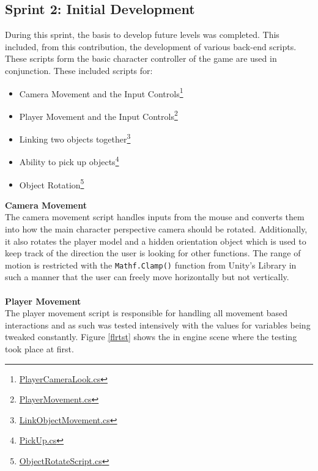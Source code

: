 \subsection{Sprint 2: Initial Development}
During this sprint, the basis to develop future levels was completed. This included, from this contribution, the development of various back-end scripts. These scripts form the basic character controller of the game are used in conjunction. These included scripts for:
\begin{itemize}
\item Camera Movement and the Input Controls\footnote{\href{https://github.com/Josh-SCG/Spherical_Shadows/blob/main/Assets/Scripts/PlayerCameraLook.cs}{PlayerCameraLook.cs}}

\item Player Movement and the Input Controls\footnote{\href{https://github.com/Josh-SCG/Spherical_Shadows/blob/main/Assets/Scripts/PlayerMovement.cs}{PlayerMovement.cs}}

\item Linking two objects together\footnote{\href{https://github.com/Josh-SCG/Spherical_Shadows/blob/main/Assets/Scripts/LinkObjectMovement.cs}{LinkObjectMovement.cs}}

\item Ability to pick up objects\footnote{\href{https://github.com/Josh-SCG/Spherical_Shadows/blob/main/Assets/Scripts/PickUp.cs}{PickUp.cs}}

\item Object Rotation\footnote{\href{https://github.com/Josh-SCG/Spherical_Shadows/blob/main/Assets/Scripts/ObjectRotateScript.cs}{ObjectRotateScript.cs}}
\end{itemize}
\newpage
\noindent \textbf{Camera Movement}\\
The camera movement script handles inputs from the mouse and converts them into how the main character perspective camera should be rotated. Additionally, it also rotates the player model and a hidden orientation object which is used to keep track of the direction the user is looking for other functions. The range of motion is restricted with the \texttt{Mathf.Clamp()} function from Unity's Library in such a manner that the user can freely move horizontally but not vertically. 
\\\\
\textbf{Player Movement}\\
The player movement script is responsible for handling all movement based interactions and as such was tested intensively with the values for variables being tweaked constantly. Figure \ref{flrtst} shows the in engine scene where the testing took place at first. 

